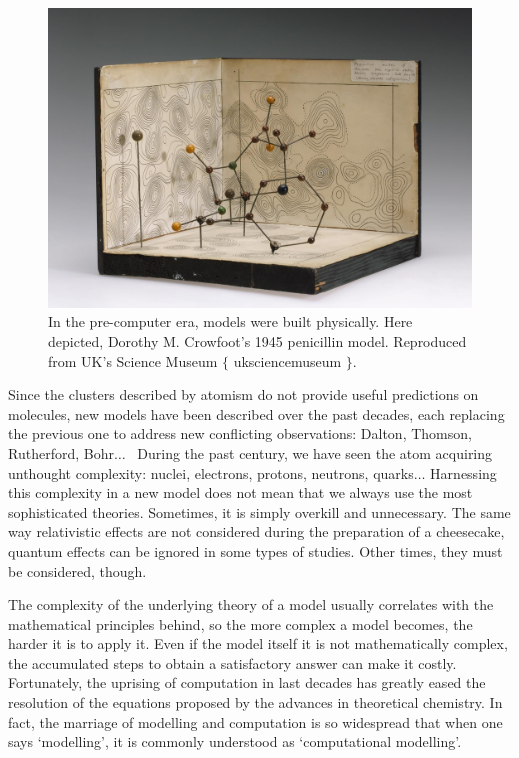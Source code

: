 \begin{figure}[H]
	\includegraphics[width=\textwidth]{./figures/01/penicillin.jpg}
	\caption[Dorothy M. Crowfoot's 1945 Penicillin model]{In the pre-computer era, models were built physically. Here depicted, Dorothy M. Crowfoot's 1945 penicillin model. Reproduced from UK's Science Museum $ \{ $ uksciencemuseum $ \} $.}
	\label{fig:penicillin}
\end{figure}


Since the clusters described by atomism do not provide useful predictions on molecules, new models have been described over the past decades, each replacing the previous one to address new conflicting observations: Dalton, Thomson, Rutherford, Bohr$ \ldots $ \  During the past century, we have seen the atom acquiring unthought complexity: nuclei, electrons, protons, neutrons, quarks$ \ldots $  Harnessing this complexity in a new model does not mean that we always use the most sophisticated theories. Sometimes, it is simply overkill and unnecessary. The same way relativistic effects are not considered during the preparation of a cheesecake, quantum effects can be ignored in some types of studies. Other times, they must be considered, though.

The complexity of the underlying theory of a model usually correlates with the mathematical principles behind, so the more complex a model becomes, the harder it is to apply it. Even if the model itself it is not mathematically complex, the accumulated steps to obtain a satisfactory answer can make it costly. Fortunately, the uprising of computation in last decades has greatly eased the resolution of the equations proposed by the advances in theoretical chemistry. In fact, the marriage of modelling and computation is so widespread that when one says ‘modelling’, it is commonly understood as ‘computational modelling’.

